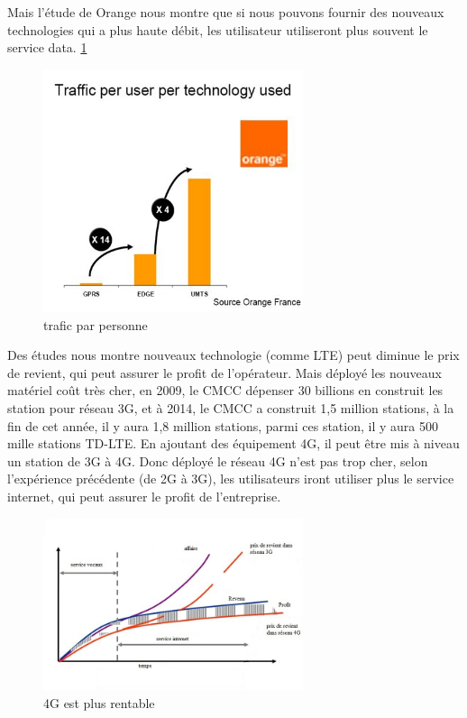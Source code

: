 Mais l'étude de Orange nous montre que si nous pouvons fournir des nouveaux technologies qui a plus haute débit, les utilisateur utiliseront plus souvent le service data.  \ref{traficparpersonne}
  \begin{figure}[H]
   \centering
   \includegraphics[width=3in]{images/orange.JPG}
   \caption{trafic par personne }
   \label{traficparpersonne}
  \end{figure}
 Des études nous montre nouveaux technologie (comme LTE) peut diminue le prix de revient, qui peut assurer le profit de l'opérateur. Mais déployé les nouveaux matériel coût très cher, en 2009, le CMCC dépenser 30 billions \textyen en construit les station pour réseau 3G, et à 2014, le CMCC a construit 1,5 million stations, à la fin de cet année, il y aura 1,8 million stations, parmi ces station, il y aura 500 mille stations TD-LTE. En ajoutant des équipement 4G, il peut être mis à niveau un station de 3G à 4G. Donc déployé le réseau 4G n'est pas trop cher, selon l'expérience précédente (de 2G à 3G), les utilisateurs iront utiliser plus le service internet, qui peut assurer le profit de l'entreprise.
      \begin{figure}[H]
          \centering
          \includegraphics[width=3in]{images/why4G.jpg}
          \caption{4G est plus rentable}
          \label{why4G}
      \end{figure}
